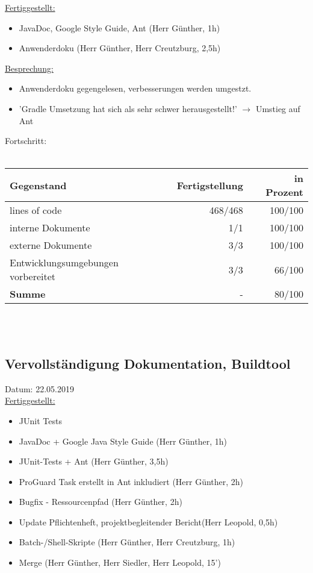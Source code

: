 \documentclass[12pt]{article}
\begin{document}
\uline{Fertiggestellt:}
\begin{itemize}\itemsep0em

\item JavaDoc, Google Style Guide, Ant (Herr Günther, 1h)
\item Anwenderdoku (Herr Günther, Herr Creutzburg, 2,5h)
\end{itemize}

\uline{Besprechung:}
\begin{itemize}\itemsep0em
\item Anwenderdoku gegengelesen, verbesserungen werden umgestzt.
\item 'Gradle Umsetzung hat sich als sehr schwer herausgestellt!' $\rightarrow$ Umstieg auf Ant

\end{itemize}

Fortschritt:\\\\
\begin{tabularx}{\textwidth}{|X|r|r|} \hline
\textbf{Gegenstand}&\textbf{Fertigstellung} & \textbf{in Prozent}\\ \hline
lines of code & 468/468  & 100/100\\ \hline
interne Dokumente & 1/1 & 100/100  \\ \hline
externe Dokumente & 3/3 & 100/100 \\ \hline
Entwicklungsumgebungen vorbereitet & 3/3 & 66/100 \\ \hline
\textbf{Summe} & - & 80/100  \\ \hline
\end{tabularx}\\\\

\newpage
\subsection{Vervollständigung Dokumentation, Buildtool}
Datum: 22.05.2019 \\

\uline{Fertiggestellt:}
\begin{itemize}\itemsep0em
\item JUnit Tests
\item JavaDoc + Google Java Style Guide (Herr Günther, 1h)
\item JUnit-Tests + Ant (Herr Günther, 3,5h)
\item ProGuard Task erstellt in Ant inkludiert (Herr Günther, 2h)
\item Bugfix - Ressourcenpfad (Herr Günther, 2h) 
\item Update Pflichtenheft, projektbegleitender Bericht(Herr Leopold, 0,5h)
\item Batch-/Shell-Skripte (Herr Günther, Herr Creutzburg, 1h)
\item Merge (Herr Günther, Herr Siedler, Herr Leopold, 15')
\end{itemize}
\end{document}
